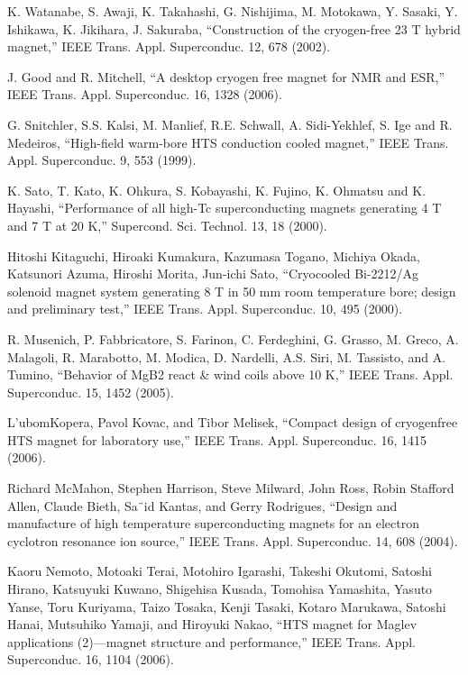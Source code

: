 \noindent [4.10] K. Watanabe, S. Awaji, K. Takahashi, G. Nishijima, M. Motokawa, Y. Sasaki,
Y. Ishikawa, K. Jikihara, J. Sakuraba, ``Construction of the cryogen-free 23 T
hybrid magnet,” IEEE Trans. Appl. Superconduc. 12, 678 (2002).

\noindent [4.11] J. Good and R. Mitchell, ``A desktop cryogen free magnet for NMR and ESR,”
IEEE Trans. Appl. Superconduc. 16, 1328 (2006).

\noindent [4.12] G. Snitchler, S.S. Kalsi, M. Manlief, R.E. Schwall, A. Sidi-Yekhlef, S. Ige and R. Medeiros, ``High-field warm-bore HTS conduction cooled magnet,” IEEE Trans.
Appl. Superconduc. 9, 553 (1999).

\noindent [4.13] K. Sato, T. Kato, K. Ohkura, S. Kobayashi, K. Fujino, K. Ohmatsu and K. Hayashi, ``Performance of all high-Tc superconducting magnets generating 4 T and 7 T at 20 K,” Supercond. Sci. Technol. 13, 18 (2000).

\noindent [4.14] Hitoshi Kitaguchi, Hiroaki Kumakura, Kazumasa Togano, Michiya Okada, Katsunori Azuma, Hiroshi Morita, Jun-ichi Sato, ``Cryocooled Bi-2212/Ag solenoid magnet system generating 8 T in 50 mm room temperature bore; design and preliminary
test,” IEEE Trans. Appl. Superconduc. 10, 495 (2000).

\noindent [4.15] R. Musenich, P. Fabbricatore, S. Farinon, C. Ferdeghini, G. Grasso, M. Greco,
A. Malagoli, R. Marabotto, M. Modica, D. Nardelli, A.S. Siri, M. Tassisto, and
A. Tumino, ``Behavior of MgB2 react \& wind coils above 10 K,” IEEE Trans. Appl.
Superconduc. 15, 1452 (2005).

\noindent [4.16] L’ubomKopera, Pavol Kovac, and Tibor Melisek, ``Compact design of cryogenfree HTS magnet for laboratory use,” IEEE Trans. Appl. Superconduc. 16, 1415 (2006).

\noindent [4.17] Richard McMahon, Stephen Harrison, Steve Milward, John Ross, Robin Stafford
Allen, Claude Bieth, Sa¨id Kantas, and Gerry Rodrigues, ``Design and manufacture
of high temperature superconducting magnets for an electron cyclotron resonance
ion source,” IEEE Trans. Appl. Superconduc. 14, 608 (2004).

\noindent [4.18] Kaoru Nemoto, Motoaki Terai, Motohiro Igarashi, Takeshi Okutomi, Satoshi Hirano, Katsuyuki Kuwano, Shigehisa Kusada, Tomohisa Yamashita, Yasuto Yanse,
Toru Kuriyama, Taizo Tosaka, Kenji Tasaki, Kotaro Marukawa, Satoshi Hanai,
Mutsuhiko Yamaji, and Hiroyuki Nakao, ``HTS magnet for Maglev applications
(2)—magnet structure and performance,” IEEE Trans. Appl. Superconduc. 16,
1104 (2006).

